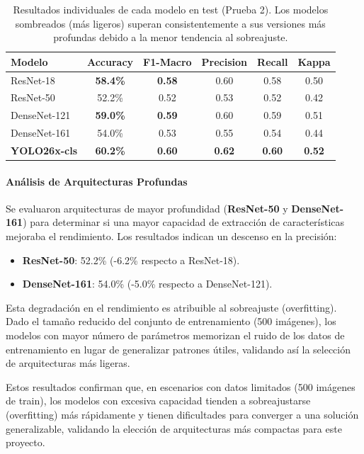 \documentclass[12pt,a4paper]{article}
\begin{document}
\begin{table}[H]
\centering
\begin{tabular}{lccccc}
\toprule
\textbf{Modelo} & \textbf{Accuracy} & \textbf{F1-Macro} & \textbf{Precision} & \textbf{Recall} & \textbf{Kappa} \\
\midrule
\rowcolor{green!10} ResNet-18 & \textbf{58.4\%} & \textbf{0.58} & 0.60 & 0.58 & 0.50 \\
ResNet-50 & 52.2\% & 0.52 & 0.53 & 0.52 & 0.42 \\
\rowcolor{green!10} DenseNet-121 & \textbf{59.0\%} & \textbf{0.59} & 0.60 & 0.59 & 0.51 \\
DenseNet-161 & 54.0\% & 0.53 & 0.55 & 0.54 & 0.44 \\
\textbf{YOLO26x-cls} & \textbf{60.2\%} & \textbf{0.60} & \textbf{0.62} & \textbf{0.60} & \textbf{0.52} \\
\bottomrule
\end{tabular}
\caption{Resultados individuales de cada modelo en test (Prueba 2). Los modelos sombreados (más ligeros) superan consistentemente a sus versiones más profundas debido a la menor tendencia al sobreajuste.}
\label{tab:resultados_individuales}
\end{table}

\paragraph{Análisis de Arquitecturas Profundas}
Se evaluaron arquitecturas de mayor profundidad (\textbf{ResNet-50} y \textbf{DenseNet-161}) para determinar si una mayor capacidad de extracción de características mejoraba el rendimiento. Los resultados indican un descenso en la precisión:
\begin{itemize}
    \item \textbf{ResNet-50}: 52.2\% (-6.2\% respecto a ResNet-18).
    \item \textbf{DenseNet-161}: 54.0\% (-5.0\% respecto a DenseNet-121).
\end{itemize}

Esta degradación en el rendimiento es atribuible al sobreajuste (overfitting). Dado el tamaño reducido del conjunto de entrenamiento (500 imágenes), los modelos con mayor número de parámetros memorizan el ruido de los datos de entrenamiento en lugar de generalizar patrones útiles, validando así la selección de arquitecturas más ligeras.

Estos resultados confirman que, en escenarios con datos limitados (500 imágenes de train), los modelos con excesiva capacidad tienden a sobreajustarse (overfitting) más rápidamente y tienen dificultades para converger a una solución generalizable, validando la elección de arquitecturas más compactas para este proyecto.
\end{document}
